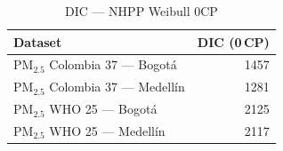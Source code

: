 \begin{table}[htbp]
\centering
\caption{DIC --- NHPP Weibull 0CP}
\label{tab:nhpp_dic_0cp}
\begin{tabular}{lr}
\toprule
Dataset & DIC (0\,CP) \\
\midrule
PM$_{2.5}$ Colombia 37 --- Bogot\'{a} & 1457 \\
PM$_{2.5}$ Colombia 37 --- Medell\'{i}n & 1281 \\
PM$_{2.5}$ WHO 25 --- Bogot\'{a} & 2125 \\
PM$_{2.5}$ WHO 25 --- Medell\'{i}n & 2117 \\
\bottomrule
\end{tabular}
\end{table}
